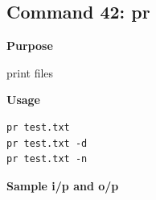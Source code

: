 \subsection{Command 42: pr} 
\textbf{Purpose}
\begin{flushleft}
 print files
\end{flushleft}
\textbf{Usage}
\begin{verbatim}
pr test.txt
pr test.txt -d
pr test.txt -n
\end{verbatim}
\textbf{Sample i/p and o/p}
\begin{figure}[H] 
\end{figure}

